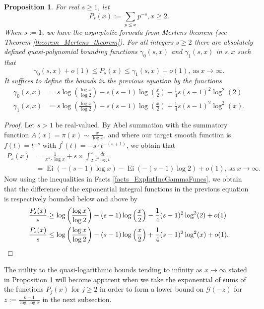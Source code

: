 \documentclass[11pt,reqno,a4letter]{article}
\numberwithin{figure}{section}
\numberwithin{table}{section}
\theoremstyle{plain}
\newtheorem{prop}[theorem]{Proposition}
\numberwithin{theorem}{section}
\theoremstyle{definition}
\newcommand{\NBRef}[1]{}
\begin{document}
\begin{prop} 
\label{cor_PartialSumsOfReciprocalsOfPrimePowers} 
For real $s \geq 1$, let 
\[
P_s(x) := \sum_{p \leq x} p^{-s}, x \geq 2. 
\]
When $s := 1$, we have the asymptotic formula from Mertens theorem 
(see Theorem \ref{theorem_Mertens_theorem}). 
For all integers $s \geq 2$ 
there are absolutely defined quasi-polynomial bounding functions 
$\gamma_0(s, x)$ and $\gamma_1(s, x)$ in $s,x$ such that 
\[
\gamma_0(s, x) + o(1) \leq P_s(x) \leq \gamma_1(s, x) + o(1), \mathrm{\ as\ } x \rightarrow \infty. 
\] 
It suffices to define the bounds in the previous equation by the functions 
\begin{align*} 
\gamma_0(s, x) & = s\log\left(\frac{\log x}{\log 2}\right) - 
     s(s-1) \log\left(\frac{x}{2}\right) - 
     \frac{1}{4} s(s-1)^2 \log^2(2) \\ 
\gamma_1(s, x) & = s\log\left(\frac{\log x}{\log 2}\right) - s(s-1) \log\left(\frac{x}{2}\right) + 
     \frac{1}{4} s(s-1)^2 \log^2(x). 
\end{align*}
\end{prop} 
\NBRef{A05-2020-04-26} 
\begin{proof} 
Let $s > 1$ be real-valued. 
By Abel summation with the summatory function 
$A(x) = \pi(x) \sim \frac{x}{\log x}$, and where 
our target smooth function is $f(t) = t^{-s}$ with 
$f^{\prime}(t) = -s \cdot t^{-(s+1)}$, we obtain that 
\begin{align*} 
P_s(x) & = \frac{1}{x^s \cdot \log x} + s \times \int_2^{x} \frac{dt}{t^s \log t} \\ 
     & = \operatorname{Ei}(-(s-1) \log x) - \operatorname{Ei}(-(s-1) \log 2) + o(1), 
     \mathrm{\ as\ } x \rightarrow \infty. 
\end{align*} 
Now using the inequalities in Facts \ref{facts_ExpIntIncGammaFuncs}, we obtain that the 
difference of the exponential integral functions in the previous equation 
is respectively bounded below and above by 
\begin{align*} 
\frac{P_s(x)}{s} & \geq \log\left(\frac{\log x}{\log 2}\right) - (s-1) \log\left(\frac{x}{2}\right) - 
     \frac{1}{4} (s-1)^2 \log^2(2) + o(1) \\ 
\frac{P_s(x)}{s} & \leq \log\left(\frac{\log x}{\log 2}\right) - (s-1) \log\left(\frac{x}{2}\right) + 
     \frac{1}{4} (s-1)^2 \log^2(x) + o(1). 
     \qedhere 
\end{align*} 
\end{proof} 

The utility to the quasi-logarithmic bounds tending to 
infinity as $x \rightarrow \infty$ stated in 
Proposition \ref{cor_PartialSumsOfReciprocalsOfPrimePowers} 
will become apparent when we take the exponential of sums of the 
functions $P_j(x)$ for $j \geq 2$ in order to form a lower bound on 
$\mathcal{G}(-z)$ for $z := \frac{k-1}{\log\log x}$ in the 
next subsection. 
\end{document}
